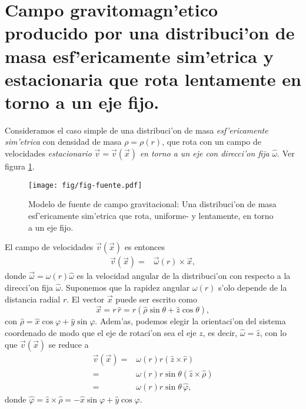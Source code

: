 \section{Campo gravitomagn'etico producido por una distribuci'on de masa esf'ericamente sim'etrica y estacionaria que rota lentamente en torno a un eje fijo.}

Consideramos el caso simple de una distribuci'on de masa \textit{esf'ericamente sim'etrica} con densidad de masa $\rho =\rho (r)$, que rota con un campo de velocidades \textit{estacionario} $\vec{v}=\vec{v}(\vec{x})$ \textit{en torno a un eje con direcci'on fija} $\hat{\omega}$. Ver figura \ref{fig:fuente}.
\begin{figure}[H]
\centering
\texttt{[image: fig/fig-fuente.pdf]}
\caption{Modelo de fuente de campo gravitacional: Una distribuci'on de masa esf'ericamente sim'etrica que rota, uniforme- y lentamente, en torno a un eje fijo.}
\label{fig:fuente}
\end{figure}

El campo de velocidades $\vec{v}(\vec{x})$ es entonces
\begin{align}
\vec{v}(\vec{x})={}&\vec{\omega}(r)\times\vec{x},
\end{align}
donde $\vec{\omega}=\omega(r)\hat{\omega}$ es la velocidad angular de la distribuci'on con respecto a la direcci'on fija $\hat{\omega}$. Suponemos que la rapidez angular $\omega(r)$ s'olo depende de la distancia radial $r$. El vector $\vec{x}$ puede ser escrito como
\begin{equation}
\vec{x}=r\, \hat{r}=r\left(\hat{\rho}\sin\theta +\hat{z}\cos\theta\right),
\end{equation}
con $\hat{\rho}=\hat{x}\cos\varphi+\hat{y}\sin\varphi$. Adem'as, podemos elegir la orientaci'on del sistema coordenado de modo que el eje de rotaci'on sea el eje $z$, es decir, $\hat{\omega}=\hat{z}$, con lo que $\vec{v}(\vec{x})$ se reduce a
\begin{align}
\vec{v}(\vec{x})={}&\omega(r)r(\hat{z}\times\hat{r})\\
 ={}&\omega(r)r\sin \theta (\hat{z}\times\hat{\rho})\\
 ={}&\omega(r)r\sin \theta\, \hat{\varphi} ,\label{campovelocidad}
\end{align}
donde $\hat{\varphi }=\hat{z}\times\hat{\rho}=-\hat{x}\sin\varphi +\hat{y}\cos\varphi $.

